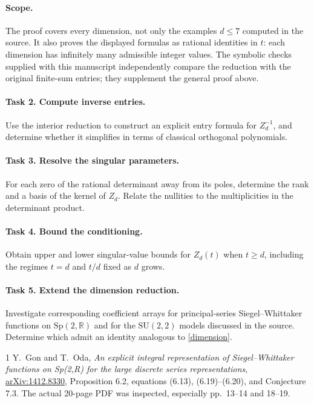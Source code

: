 \documentclass[10pt]{article}
\begin{document}
\paragraph{Scope.}
The proof covers every dimension, not only the examples \(d\le7\)
computed in the source. It also proves the displayed formulas as
rational identities in \(t\): each dimension has infinitely many
admissible integer values. The symbolic checks supplied with this
manuscript independently compare the reduction with the original
finite-sum entries; they supplement the general proof above.

\paragraph{Task 2. Compute inverse entries.}
Use the interior reduction to construct an explicit entry formula
for \(Z_d^{-1}\), and determine whether it simplifies in terms of
classical orthogonal polynomials.

\paragraph{Task 3. Resolve the singular parameters.}
For each zero of the rational determinant away from its poles,
determine the rank and a basis of the kernel of \(Z_d\). Relate the
nullities to the multiplicities in the determinant product.

\paragraph{Task 4. Bound the conditioning.}
Obtain upper and lower singular-value bounds for \(Z_d(t)\) when
\(t\ge d\), including the regimes \(t=d\) and \(t/d\) fixed as
\(d\) grows.

\paragraph{Task 5. Extend the dimension reduction.}
Investigate corresponding coefficient arrays for principal-series
Siegel--Whittaker functions on \(\mathrm{Sp}(2,\mathbb R)\) and
for the \(\mathrm{SU}(2,2)\) models discussed in the source.
Determine which admit an identity analogous to \eqref{dimension}.

\begin{thebibliography}{1}
 Y.~Gon and T.~Oda,
\emph{An explicit integral representation of Siegel--Whittaker
functions on Sp(2,R) for the large discrete series representations},
\href{https://arxiv.org/abs/1412.8330}{arXiv:1412.8330},
Proposition 6.2, equations (6.13), (6.19)--(6.20), and Conjecture 7.3.
The actual 20-page PDF was inspected, especially pp.~13--14 and 18--19.
\end{thebibliography}
\end{document}
